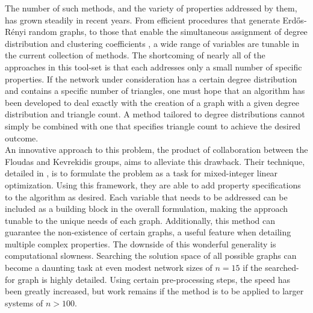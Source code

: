 \documentclass[11pt]{article}
\begin{document}
\indent The number of such methods, and the variety of properties addressed by them, has grown steadily in recent years. From efficient procedures that generate Erd\H{o}s-R\'{e}nyi random graphs, to those that enable the simultaneous assignment of degree distribution and clustering coefficients \cite{Batagelj2005} \cite{Deijfen2009}, a wide range of variables are tunable in the current collection of methods. The shortcoming of nearly all of the approaches in this tool-set is that each addresses only a small number of specific properties. If the network under consideration has a certain degree distribution and contains a specific number of triangles, one must hope that an algorithm has been developed to deal exactly with the creation of a graph with a given degree distribution and triangle count. A method tailored to degree distributions cannot simply be combined with one that specifies triangle count to achieve the desired outcome. \vspace{1mm}\\
\indent An innovative approach to this problem, the product of collaboration between the Floudas and Kevrekidis groups, aims to alleviate this drawback. Their technique, detailed in \cite{Gounaris2013}, is to formulate the problem as a task for mixed-integer linear optimization. Using this framework, they are able to add property specifications to the algorithm as desired. Each variable that needs to be addressed can be included as a building block in the overall formulation, making the approach tunable to the unique needs of each graph. Additionally, this method can guarantee the non-existence of certain graphs, a useful feature when detailing multiple complex properties. The downside of this wonderful generality is computational slowness. Searching the solution space of all possible graphs can become a daunting task at even modest network sizes of $n=15$ if the searched-for graph is highly detailed. Using certain pre-processing steps, the speed has been greatly increased, but work remains if the method is to be applied to larger systems of $n>100$. 
\end{document}
